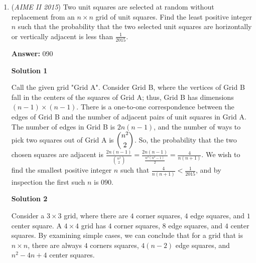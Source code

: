 \begin{enumerate}
 Note that we have the two right triangles to the side; one of each of their bases is an altitude, which we know the length to be $4a$. The length of the other base can be calculated as $\dfrac{(6a+b)-b}2=3a$ via simple isosceles trapezoid geometry; it is clear that each right triangle is actually a $3-4-5$ triangle, so we know their hypotenuses (and the remaining unknown sides of our original trapezoid) have length $5a$ (because of the $3a$ and $4a$ bases). Our answer is therefore $5a+5a+b+6a+b=16a+2b=16\log2+2\log3=\log\left(2^{16}3^2\right)$; $p+q=16+2=\boxed{018}$. QED. 

 


 


	\item (\textit{AIME II 2015}) Two unit squares are selected at random without replacement from an $n \times n$ grid of unit squares. Find the least positive integer $n$ such that the probability that the two selected unit squares are horizontally or vertically adjacent is less than $\frac{1}{2015}$.


 
 \textbf{Answer: }090



\textbf{Solution 1}

Call the given grid "Grid A". Consider Grid B, where the vertices of Grid B fall in the centers of the squares of Grid A; thus, Grid B has dimensions $(n-1) \times (n-1)$. There is a one-to-one correspondence between the edges of Grid B and the number of adjacent pairs of unit squares in Grid A. The number of edges in Grid B is $2n(n-1)$, and the number of ways to pick two squares out of Grid A is $\dbinom{n^2}{2}$. So, the probability that the two chosen squares are adjacent is $\frac{2n(n-1)}{\binom{n^2}{2}} = \frac{2n(n-1)}{\frac{n^2(n^2-1)}{2}} = \frac{4}{n(n+1)}$. We wish to find the smallest positive integer $n$ such that $\frac{4}{n(n+1)} < \frac{1}{2015}$, and by inspection the first such $n$ is $\boxed{090}$.

 


 



\textbf{Solution 2}

Consider a $3 \times 3$ grid, where there are $4$ corner squares, $4$ edge squares, and $1$ center square. A $4 \times 4$ grid has $4$ corner squares, $8$ edge squares, and $4$ center squares. By examining simple cases, we can conclude that for a grid that is $n \times n$, there are always $4$ corners squares, $4(n-2)$ edge squares, and $n^2-4n+4$ center squares. 


\end{enumerate}
